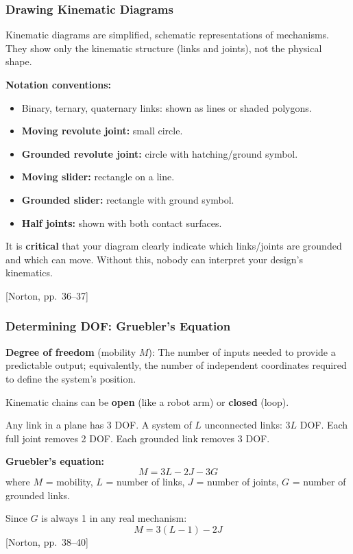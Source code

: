 \documentclass[10pt,aspectratio=43]{beamer}
\newcommand{\pref}[1]{\vfill\hfill{\scriptsize\color{gray}[Norton, pp.~#1]}}
\begin{document}
\begin{frame}
\frametitle{Drawing Kinematic Diagrams}

Kinematic diagrams are simplified, schematic representations of mechanisms. They show only the kinematic structure (links and joints), not the physical shape.

\vspace{6pt}
\textbf{Notation conventions:}
\begin{itemize}
  \item Binary, ternary, quaternary links: shown as lines or shaded polygons.
  \item \textbf{Moving revolute joint:} small circle.
  \item \textbf{Grounded revolute joint:} circle with hatching/ground symbol.
  \item \textbf{Moving slider:} rectangle on a line.
  \item \textbf{Grounded slider:} rectangle with ground symbol.
  \item \textbf{Half joints:} shown with both contact surfaces.
\end{itemize}

\vspace{4pt}
\begin{redbox}
It is \textbf{critical} that your diagram clearly indicate which links/joints are grounded and which can move. Without this, nobody can interpret your design's kinematics.
\end{redbox}
\pref{36--37}
\end{frame}


\begin{frame}
\frametitle{Determining DOF: Gruebler's Equation}

\begin{yellowbox}
\textbf{Degree of freedom} (mobility $M$): The number of inputs needed to provide a predictable output; equivalently, the number of independent coordinates required to define the system's position.
\end{yellowbox}

\vspace{4pt}
Kinematic chains can be \textbf{open} (like a robot arm) or \textbf{closed} (loop).

\vspace{4pt}
Any link in a plane has 3 DOF. A system of $L$ unconnected links: $3L$ DOF. Each full joint removes 2 DOF. Each grounded link removes 3 DOF.

\vspace{4pt}
\begin{redbox}
\textbf{Gruebler's equation:}
\[
  M = 3L - 2J - 3G \tag{2.1a}
\]
where $M$ = mobility, $L$ = number of links, $J$ = number of joints, $G$ = number of grounded links.
\end{redbox}

Since $G$ is always 1 in any real mechanism:
\[
  M = 3(L - 1) - 2J \tag{2.1b}
\]
\pref{38--40}
\end{frame}
\end{document}
